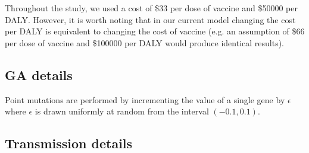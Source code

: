 \documentclass[12pt]{article}
\begin{document}
Throughout the study, we used a cost of 
\$33 per dose of vaccine and
\$50000 per DALY.
However, it is worth noting that in our current model
changing the cost per DALY is equivalent to changing
the cost of vaccine (e.g. an assumption of \$66 per dose of vaccine
and \$100000 per DALY would produce identical results).


\subsection*{GA details}

Point mutations are performed by
incrementing the value of a single gene by $\epsilon$ 
where $\epsilon$ is drawn uniformly
at random from the interval $(-0.1, 0.1)$.


\subsection*{Transmission details}
\end{document}
